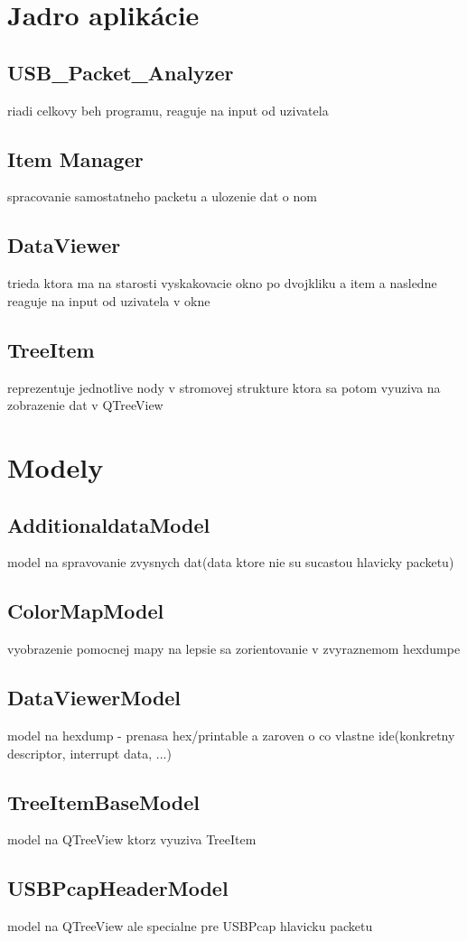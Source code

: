 \section{Jadro aplikácie}
\subsection{USB\_Packet\_Analyzer}
riadi celkovy beh programu, reaguje na input od uzivatela
\subsection{Item Manager}
spracovanie samostatneho packetu a ulozenie dat o nom
\subsection{DataViewer}
trieda ktora ma na starosti vyskakovacie okno po dvojkliku a item a nasledne reaguje na input od uzivatela v okne
\subsection{TreeItem}
reprezentuje jednotlive nody v stromovej strukture ktora sa potom vyuziva na zobrazenie dat v QTreeView
\section{Modely}
\subsection{AdditionaldataModel}
model na spravovanie zvysnych dat(data ktore nie su sucastou hlavicky packetu)
\subsection{ColorMapModel}
vyobrazenie pomocnej mapy na lepsie sa zorientovanie v zvyraznemom hexdumpe
\subsection{DataViewerModel}
model na hexdump - prenasa hex/printable a zaroven o co vlastne ide(konkretny descriptor, interrupt data, ...)
\subsection{TreeItemBaseModel}
model na QTreeView ktorz vyuziva TreeItem
\subsection{USBPcapHeaderModel}
model na QTreeView ale specialne pre USBPcap hlavicku packetu
